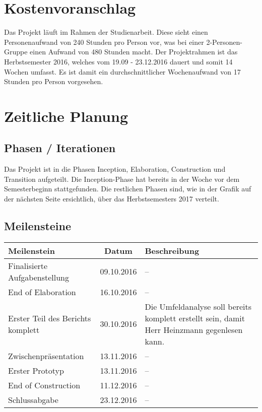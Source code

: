 
 \section{Kostenvoranschlag}
 Das Projekt läuft im Rahmen der Studienarbeit. Diese sieht einen Personenaufwand von 240 Stunden pro Person vor, was bei einer 2-Personen-Gruppe einen Aufwand von 480 Stunden macht. 
 Der Projektrahmen ist das Herbstsemester 2016, welches vom 19.09 - 23.12.2016 dauert und somit 14 Wochen umfasst. Es ist damit ein durchschnittlicher Wochenaufwand von 17 Stunden pro Person vorgesehen. 
 \section{Zeitliche Planung}
 \subsection{Phasen / Iterationen}
 Das Projekt ist in die Phasen Inception, Elaboration, Construction und Transition aufgeteilt. Die Inception-Phase hat bereits in der Woche vor dem Semesterbeginn stattgefunden. Die restlichen Phasen sind, wie in der Grafik auf der nächsten Seite ersichtlich, über das Herbstsemesters 2017 verteilt.
 
 
 
 \subsection{Meilensteine}
 \begin{tabularx}{\linewidth}{|X|c|X|}
 	\hline
 	\textbf{Meilenstein} & \textbf{Datum} & \textbf{Beschreibung} \\
 	\hline
 	Finalisierte Aufgabenstellung & 09.10.2016 & -- \\
 	\hline
 	End of Elaboration & 16.10.2016 & -- \\
 	\hline
 	Erster Teil des Berichts komplett & 30.10.2016 & Die Umfeldanalyse soll bereits komplett erstellt sein, damit Herr Heinzmann gegenlesen kann. \\
 	\hline
 	Zwischenpräsentation & 13.11.2016 & -- \\
 	\hline
 	Erster Prototyp & 13.11.2016 & -- \\
 	\hline
 	End of Construction & 11.12.2016 & -- \\
 	\hline
 	Schlussabgabe & 23.12.2016 & -- \\
 	\hline
 \end{tabularx}
 
 

